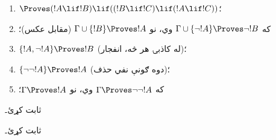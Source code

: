 \documentclass[../../../include/open-logic-section]{subfiles}
\begin{document}
\begin{prop}
\begin{enumerate}
\item $\Proves (!A \lif !B) \lif ((!B \lif !C)
  \lif (!A \lif !C))$؛ 
\item که $\Gamma \cup \{ \lnot !A\}
  \Proves \lnot !B$ وي، نو $\Gamma \cup \{ !B\} \Proves
  !A$ (مقابل عکس)؛ 
\item $\{ !A, \lnot!A\} \Proves
    !B$ (له کاذبۍ هر څه، انفجار)؛ 
\item $\{ \lnot\lnot!A\} \Proves
  !A$ (دوه ګونې نفي حذف)؛
\item که $\Gamma \Proves \lnot\lnot!A$ وي، نو $\Gamma \Proves
  !A$؛
\end{enumerate}
\end{prop}

\begin{prob}
   ثابت کړئ۔
\end{prob}
\tagendprob

\begin{prob}
   ثابت کړئ۔
\end{prob}
\tagendprob
\end{document}
